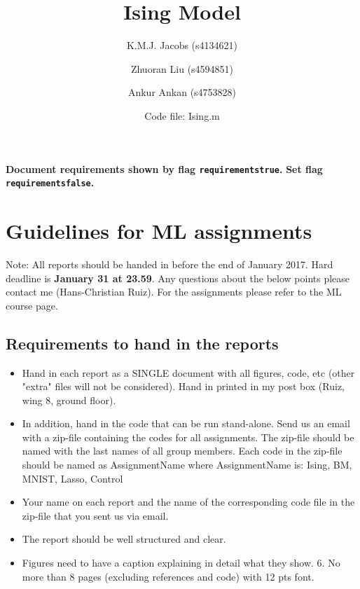 \documentclass[10pt,a4paper]{article}
\author{K.M.J. Jacobs (s4134621) \and Zhuoran Liu (s4594851) \and Ankur Ankan (s4753828) \and Code file: Ising.m}
\title{Ising Model}
\newif\ifrequirements
\begin{document}
\maketitle

\ifrequirements
\color{red}
\textbf{Document requirements shown by flag \texttt{requirementstrue}.}
\textbf{Set flag \texttt{requirementsfalse}.}

\color{blue}
\section{Guidelines for ML assignments}
Note: All reports should be handed in before the end of January 2017. Hard deadline is \textbf{January 31 at 23.59}. Any questions about the below points please contact me (Hans-Christian Ruiz). For the assignments please refer to the ML course page.

\subsection{Requirements to hand in the reports}
\begin{itemize}
\item Hand in each report as a SINGLE document with all figures, code, etc (other "extra" files will not be considered). Hand in printed in my post box (Ruiz, wing 8, ground floor).
\item In addition, hand in the code that can be run stand-alone. Send us an email with a zip-file containing the codes for all assignments. The zip-file should be named with the last names of all group members. Each code in the zip-file should be named as AssignmentName where AssignmentName is: Ising, BM, MNIST, Lasso, Control
\item Your name on each report and the name of the corresponding code file in the zip-file that you sent us via email.
\item The report should be well structured and clear.
\item Figures need to have a caption explaining in detail what they show. 6. No more than 8 pages (excluding references and code) with 12 pts font.
\end{itemize}
\end{document}
